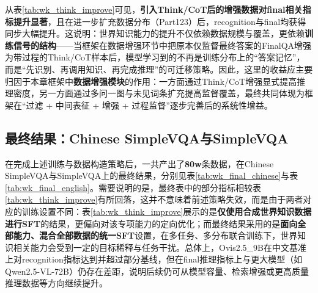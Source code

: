 \begin{table}[htbp]
\centering
\small
\renewcommand{\arraystretch}{1.3}
\caption{实验二：引入Think/CoT与数据扩充后的改进结果（Chinese SimpleVQA）。Part12/Part123表示逐步扩充的数据批次；think表示FinalQA带推理过程的训练设置；Gap为最优模型相对qwen2.5-VL-7b的提升。}
\label{tab:wk_think_improve}
\end{table}

从表\ref{tab:wk_think_improve}可见，\textbf{引入Think/CoT后的增强数据对final相关指标提升显著}，且在进一步扩充数据分布（Part123）后，recognition与final均获得同步大幅提升。这说明：世界知识能力的提升不仅依赖数据规模与覆盖，更依赖\textbf{训练信号的结构}——当框架在数据增强环节中把原本仅监督最终答案的FinalQA增强为带过程的Think/CoT样本后，模型学习到的不再是训练分布上的“答案记忆”，而是“先识别、再调用知识、再完成推理”的可迁移策略。因此，这里的收益应主要归因于本章框架中\textbf{数据增强模块}的作用：一方面通过Think/CoT增强显式提高推理密度，另一方面通过多问一图与未见词条扩充提高监督覆盖，最终共同体现为框架在“过滤 + 中间表征 + 增强 + 过程监督”逐步完善后的系统性增益。

\subsection{最终结果：Chinese SimpleVQA与SimpleVQA}
在完成上述训练与数据构造策略后，一共产出了\textbf{80w}条数据，在Chinese SimpleVQA与SimpleVQA上的最终结果，分别见表\ref{tab:wk_final_chinese}与表\ref{tab:wk_final_english}。需要说明的是，最终表中的部分指标相较表\ref{tab:wk_think_improve}有所回落，这并不意味着前述策略失效，而是由于两者对应的训练设置不同：表\ref{tab:wk_think_improve}展示的是\textbf{仅使用合成世界知识数据进行SFT}的结果，更偏向对该专项能力的定向优化；而最终结果采用的是\textbf{面向全部能力、混合全部数据的统一SFT}设置，在多任务、多分布联合训练下，世界知识相关能力会受到一定的目标稀释与任务干扰。总体上，Ovis2.5\_9B在中文基准上对recognition指标达到并超过部分基线，但在final推理指标上与更大模型（如Qwen2.5-VL-72B）仍存在差距，说明后续仍可从模型容量、检索增强或更高质量推理数据等方向继续提升。

